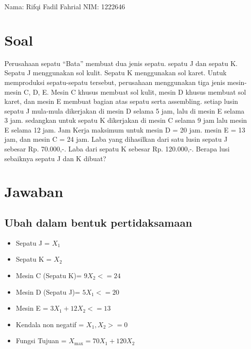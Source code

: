 \documentclass{article}
\begin{document}
Nama: Rifqi Fadil Fahrial \newline
NIM: 1222646 \newline



\section{Soal}
Perusahaan sepatu “Bata”
membuat dua jenis sepatu. sepatu J dan sepatu K. Sepatu J menggunakan sol kulit.
Sepatu K menggunakan sol karet. Untuk memproduksi sepatu-sepatu tersebut,
perusahaan menggunakan tiga jenis mesin-mesin C, D, E. Mesin C khusus membuat
sol kulit, mesin D khusus membuat sol karet, dan mesin E membuat bagian atas
sepatu serta assembling. setiap lusin sepatu J mula-mula dikerjakan di mesin D
selama 5 jam, lalu di mesin E selama 3 jam. sedangkan untuk sepatu K dikerjakan
di mesin C selama 9 jam lalu mesin E selama 12 jam. Jam Kerja maksimum untuk
mesin D = 20 jam. mesin E = 13 jam, dan mesin C = 24 jam. Laba yang dihasilkan
dari satu lusin sepatu J sebesar Rp. 70.000,-. Laba dari sepatu K sebesar Rp. 120.000,-.
Berapa lusi sebaiknya sepatu J dan K dibuat?
\section{Jawaban}
\subsection*{Ubah dalam bentuk pertidaksamaan}
\begin{itemize}
  \item Sepatu J = $ X_1$ 
  \item Sepatu K = $ X_2$
  \item Mesin C (Sepatu K)= $ 9X_2 <= 24$
  \item Mesin D (Sepatu J)= $ 5X_1 <= 20$
  \item Mesin E = $ 3X_1 + 12X_2 <= 13$
  \item Kendala non negatif = $X_1,X_2 >= 0$
  \item Fungsi Tujuan = $X_{\text{max}} = 70X_1 + 120X_2$
\end{itemize}
\end{document}
